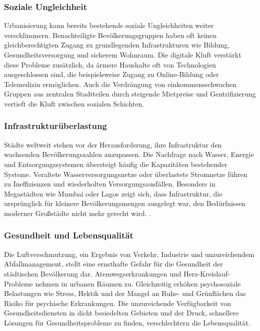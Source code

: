 \documentclass[conference,compsoc,final,a4paper, onecolumn, 11pt]{IEEEtran}
\begin{document}
\subsubsection{Soziale Ungleichheit}
Urbanisierung kann bereits bestehende soziale Ungleichheiten weiter verschlimmern.
Benachteiligte Bevölkerungsgruppen haben oft keinen gleichberechtigten Zugang zu grundlegenden Infrastrukturen wie Bildung, Gesundheitsversorgung und sicherem Wohnraum.
Die digitale Kluft verstärkt diese Probleme zusätzlich, da ärmere Haushalte oft von Technologien ausgeschlossen sind, die beispielsweise Zugang zu Online-Bildung oder Telemedizin ermöglichen.
Auch die Verdrängung von einkommensschwachen Gruppen aus zentralen Stadtteilen durch steigende Mietpreise und Gentrifizierung vertieft die Kluft zwischen sozialen Schichten. \autocite{digital_how_2024}


\subsubsection{Infrastrukturüberlastung}
Städte weltweit stehen vor der Herausforderung, ihre Infrastruktur den wachsenden Bevölkerungszahlen anzupassen. 
Die Nachfrage nach Wasser, Energie und Entsorgungssystemen übersteigt häufig die Kapazitäten bestehender Systeme. 
Veraltete Wasserversorgungsnetze oder überlastete Stromnetze führen zu Ineffizienzen und wiederholten Versorgungsausfällen. 
Besonders in Megastädten wie Mumbai oder Lagos zeigt sich, dass Infrastruktur, die ursprünglich für kleinere Bevölkerungsmengen ausgelegt war, den Bedürfnissen moderner Großstädte nicht mehr gerecht wird. \autocite{mckinsey_global_institute_smart_2021}.


\subsubsection{Gesundheit und Lebensqualität}
Die Luftverschmutzung, ein Ergebnis von Verkehr, Industrie und unzureichendem Abfallmanagement, stellt eine ernsthafte Gefahr für die Gesundheit der städtischen Bevölkerung dar. 
Atemwegserkrankungen und Herz-Kreislauf-Probleme nehmen in urbanen Räumen zu. 
Gleichzeitig erhöhen psychosoziale Belastungen wie Stress, Hektik und der Mangel an Ruhe- und Grünflächen das Risiko für psychische Erkrankungen. 
Die unzureichende Verfügbarkeit von Gesundheitsdiensten in dicht besiedelten Gebieten und der Druck, schnellere Lösungen für Gesundheitsprobleme zu finden, verschlechtern die Lebensqualität. \autocite{un_habitat_world_2022}
\end{document}
